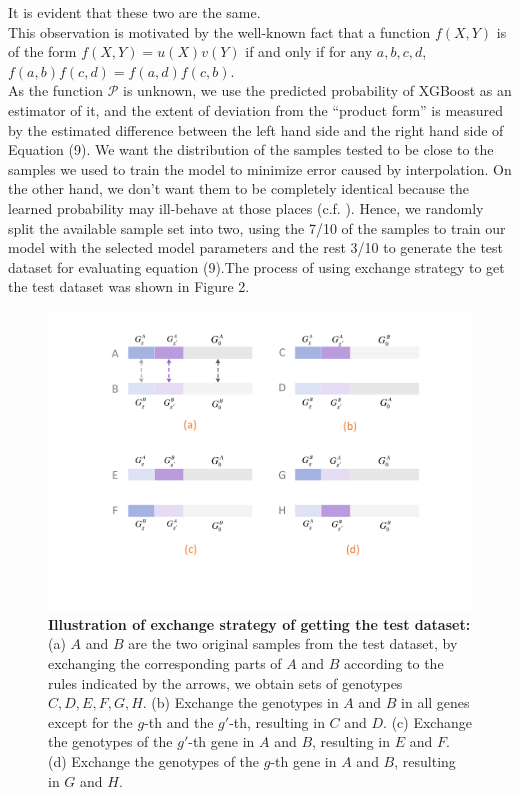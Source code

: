 \documentclass[11pt]{article}
\theoremstyle{plain}
\theoremstyle{definition}
\theoremstyle{remark}
\begin{document}
\noindent It is evident that these two are the same.\\

\noindent This observation is motivated by the well-known fact that a function $f(X,Y)$ is of the form $f(X,Y)=u(X)v(Y)$ if and only if for any $a,b,c,d$, $f(a,b)f(c,d)=f(a,d)f(c,b)$.\\

\noindent As the function $\mathcal{P}$ is unknown, we use the predicted probability of XGBoost as an estimator of it, and the extent of deviation from the ``product form'' is measured by the estimated difference between the left hand side and the right hand side of Equation (9). We want the distribution of the samples tested to be close to the samples we used to train the model to minimize error caused by interpolation. On the other hand, we don't want them to be completely identical because the learned probability may ill-behave at those places (c.f. \cite{13}). Hence, we randomly split the available sample set into two, using the 7/10 of the samples to train our model with the selected model parameters and the rest 3/10 to generate the test dataset for evaluating equation (9).The process of using exchange strategy to get the test dataset was shown in Figure 2.\\

\begin{figure}[H]
    \begin{center}
       \includegraphics[scale=0.6]{exchange.pdf}
    \end{center}
\caption{\label{det}{\bf Illustration of exchange strategy of getting the test dataset:} (a) $A$ and $B$ are the two original samples from the test dataset, by exchanging the corresponding parts of $A$ and $B$ according to the rules indicated by the arrows, we obtain sets of genotypes $C, D,E,F,G,H$. (b) Exchange the genotypes in $A$ and $B$ in all genes except for the $g$-th and the $g'$-th, resulting in $C$ and $D$. (c)  Exchange the genotypes of the $g'$-th gene in $A$ and $B$, resulting in $E$ and $F$. (d) Exchange the genotypes of the $g$-th gene in $A$ and $B$, resulting in $G$ and $H$.}
\end{figure}
\end{document}
